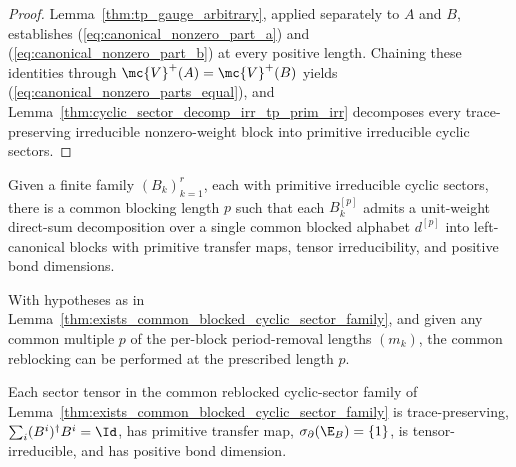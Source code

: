 \begin{proof}\leanok
    Lemma~\ref{thm:tp_gauge_arbitrary}, applied separately to $A$ and $B$,
    establishes (\ref{eq:canonical_nonzero_part_a}) and
    (\ref{eq:canonical_nonzero_part_b}) at every positive length. Chaining these
    identities through $\mc{V}^+(A)=\mc{V}^+(B)$ yields
    (\ref{eq:canonical_nonzero_parts_equal}), and
    Lemma~\ref{thm:cyclic_sector_decomp_irr_tp_prim_irr} decomposes every
    trace-preserving irreducible nonzero-weight block into primitive irreducible
    cyclic sectors.
\end{proof}

\begin{lemma}%
    \label{thm:exists_common_blocked_cyclic_sector_family}
    \leanok
    Given a finite family $(B_k)_{k=1}^r$, each with primitive irreducible cyclic
    sectors, there is a common blocking length $p$ such that each $B_k^{[p]}$
    admits a unit-weight direct-sum decomposition over a single common blocked
    alphabet $d^{[p]}$ into left-canonical blocks with primitive transfer maps,
    tensor irreducibility, and positive bond dimensions.
\end{lemma}

\begin{lemma}%
    \label{thm:exists_common_blocked_cyclic_sector_family_common_multiple}
    \leanok
    With hypotheses as in
    Lemma~\ref{thm:exists_common_blocked_cyclic_sector_family}, and given any
    common multiple $p$ of the per-block period-removal lengths $(m_k)$, the
    common reblocking can be performed at the prescribed length $p$.
\end{lemma}

\begin{lemma}%
    \label{thm:common_blocked_cyclic_sector_derived_properties}
    \leanok
    Each sector tensor in the common reblocked cyclic-sector family of
    Lemma~\ref{thm:exists_common_blocked_cyclic_sector_family} is
    trace-preserving, $\sum_i(B^i)^\dagger B^i=\Id$, has primitive transfer
    map, $\sigma_\partial(\E_B)=\{1\}$, is tensor-irreducible, and has positive
    bond dimension.
\end{lemma}

